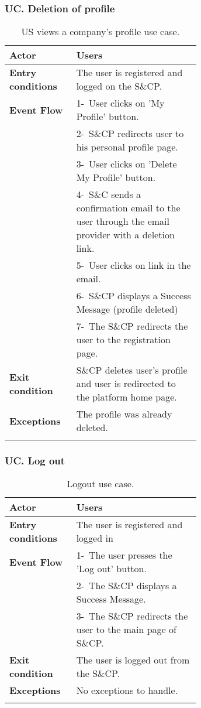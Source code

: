 \subsubsection*{UC\cuc . Deletion of profile}
\begin{center}
    \begin{longtable}{|l|p{0.65\linewidth}|}
        \hline
        \textbf{Actor}            & Users \\
        \hline
        \textbf{Entry conditions} & The user is registered and logged on the S\&CP. \\
        \hline
        \textbf{Event Flow}       & 1-\ User clicks on 'My Profile' button.   \\
        & 2-\ S\&CP redirects user to his personal profile page.\\
        & 3-\ User clicks on 'Delete My Profile' button.\\
        & 4-\ S\&C sends a confirmation email to the user through the email provider with a deletion link.\\
        & 5-\ User clicks on link in the email. \\
        & 6-\ S\&CP displays a Success Message (profile deleted)\\
        & 7-\ The S\&CP redirects the user to the registration page.\\
        \hline
        \textbf{Exit condition}   &  S\&CP deletes user's profile and user is redirected to the platform home page. \\
        \hline
        \textbf{Exceptions}       & The profile was already deleted. \\
        \hline
        \caption{US views a company's profile use case.}
        \label{tab: cp_use_case}
    \end{longtable}
\end{center}


\subsubsection*{UC\cuc . Log out}
\begin{center}
    \begin{longtable}{|l|p{0.65\linewidth}|}
        \hline
        \textbf{Actor}            & Users \\
        \hline
        \textbf{Entry conditions} & The user is registered and logged in \\
        \hline
        \textbf{Event Flow}       & 1-\  The user presses the 'Log out' button. \\
        & 2-\ The S\&CP displays a Success Message.\\
        & 3-\ The S\&CP redirects the user to the main page of S\&CP.\\
        \hline
        \textbf{Exit condition}   &  The user is logged out from the S\&CP. \\
        \hline
        \textbf{Exceptions}       & No exceptions to handle. \\
        \hline
        \caption{Logout use case.}
        \label{tab: logout_use_case}
    \end{longtable}
\end{center}

